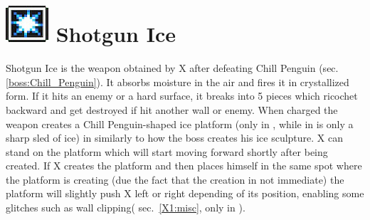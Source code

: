 \section{\includegraphics[scale=0.2]{figures/X1/weapons/S_ice.jpg} Shotgun Ice}\label{Shotgun_ice}
Shotgun Ice is the weapon obtained by X after defeating Chill Penguin (sec.\ref{boss:Chill_Penguin}). It absorbs moisture in the air and fires it in crystallized form. If it hits an enemy or a hard surface, it breaks into 5 pieces which ricochet backward and get destroyed if hit another wall or enemy. When charged the weapon creates a Chill Penguin-shaped ice platform (only in \x, while in \mhx is only a sharp sled of ice) in similarly to how the boss creates his ice sculpture. X can stand on the platform which will start moving forward shortly after being created. If X creates the platform and then places himself in the same spot where the platform is creating (due the fact that the creation in not immediate) the platform will slightly push X left or right depending of its position, enabling some glitches such as wall clipping( sec.~\ref{X1:misc}, only in \x).
